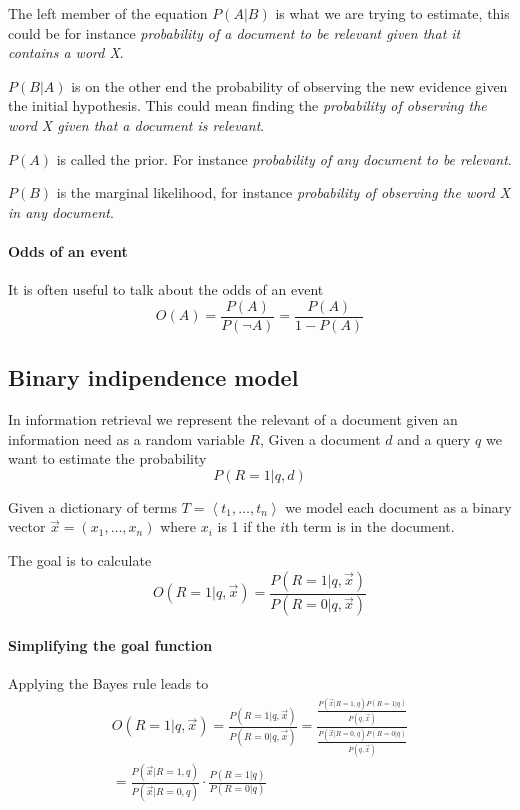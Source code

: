 The left member of the equation $P(A|B)$ is what we are trying to estimate, 
this could be for instance \emph{probability of a document to be relevant 
given that it contains a word X}.

$P(B|A)$ is on the other end the probability of observing the new evidence 
given the initial hypothesis. This could mean finding the \emph{probability 
of observing the word X given that a document is relevant}. 

$P(A)$ is called the prior. For instance \emph{probability of any document to 
be relevant}.

$P(B)$ is the marginal likelihood, for instance \emph{probability of observing 
the word X in any document}.

\paragraph{Odds of an event}
It is often useful to talk about the odds of an event 
$$O(A) = \frac{P(A)}{P(\neg A)} = \frac{P(A)}{1 - P(A)}$$



\subsection{Binary indipendence model}
\label{binary-ind}

In information retrieval we represent the relevant of a document 
given an information need as a random variable $R$, Given a document $d$
and a query $q$ we want to estimate the probability $$P(R = 1 |q, d)$$

Given a dictionary of terms $T = \left\langle t_1, \dots, t_n \right\rangle $ 
we model each document as a binary vector $\vec{x} = (x_1, \dots, x_n)$
where $x_i$ is 1 if the $i$th term is in the document.

The goal is to calculate 
$$O(R=1 | q, \vec{x}) = \frac{P(R=1|q, \vec{x})}{P(R=0|q, \vec{x})}$$

\paragraph{Simplifying the goal function}
Applying the Bayes rule leads to
\begin{equation}
    \begin{aligned}
        O(R=1 | q, \vec{x}) = \frac{P(R=1|q, \vec{x})}{P(R=0|q, \vec{x})}
        = \frac{\frac{P(\vec{x}|R=1,q)P(R=1|q)}{P(q, \vec{x})}}{\frac{P(\vec{x}|R=0,q)P(R=0|q)}{P(q, \vec{x})}}\\
        = \frac{P(\vec{x}| R = 1, q)}{P(\vec{x}| R = 0, q)}\cdot\frac{P(R=1|q)}{P(R=0|q)}
    \end{aligned}
\end{equation}

